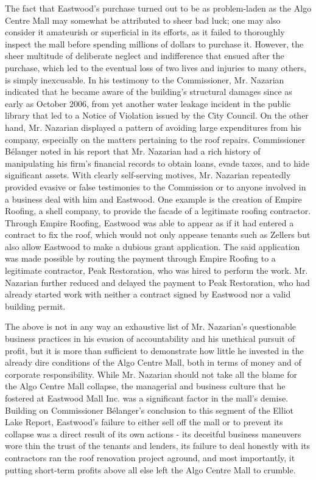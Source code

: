 \documentclass[12pt]{article}
\begin{document}
The fact that Eastwood's purchase turned out to be as problem-laden as the Algo Centre Mall may somewhat be attributed to sheer bad luck; one may also consider it amateurish or superficial in its efforts, as it failed to thoroughly inspect the mall before spending millions of dollars to purchase it. However, the sheer multitude of deliberate neglect and indifference that ensued after the purchase, which led to the eventual loss of two lives and injuries to many others, is simply inexcusable. In his testimony to the Commissioner, Mr. Nazarian indicated that he became aware of the building's structural damages since as early as October 2006, from yet another water leakage incident in the public library that led to a Notice of Violation issued by the City Council. On the other hand, Mr. Nazarian displayed a pattern of avoiding large expenditures from his company, especially on the matters pertaining to the roof repairs. Commissioner Bélanger noted in his report that Mr. Nazarian had a rich history of manipulating his firm's financial records to obtain loans, evade taxes, and to hide significant assets. With clearly self-serving motives, Mr. Nazarian repeatedly provided evasive or false testimonies to the Commission or to anyone involved in a business deal with him and Eastwood. One example is the creation of Empire Roofing, a shell company, to provide the facade of a legitimate roofing contractor. Through Empire Roofing, Eastwood was able to appear as if it had entered a contract to fix the roof, which would not only appease tenants such as Zellers but also allow Eastwood to make a dubious grant application. The said application was made possible by routing the payment through Empire Roofing to a legitimate contractor, Peak Restoration, who was hired to perform the work. Mr. Nazarian further reduced and delayed the payment to Peak Restoration, who had already started work with neither a contract signed by Eastwood nor a valid building permit. 

The above is not in any way an exhaustive list of Mr. Nazarian's questionable business practices in his evasion of accountability and his unethical pursuit of profit, but it is more than sufficient to demonstrate how little he invested in the already dire conditions of the Algo Centre Mall, both in terms of money and of corporate responsibility. While Mr. Nazarian should not take all the blame for the Algo Centre Mall collapse, the managerial and business culture that he fostered at Eastwood Mall Inc. was a significant factor in the mall's demise. Building on Commissioner Bélanger's conclusion to this segment of the Elliot Lake Report, Eastwood's failure to either sell off the mall or to prevent its collapse was a direct result of its own actions - its deceitful business maneuvers wore thin the trust of the tenants and lenders, its failure to deal honestly with its contractors ran the roof renovation project aground, and most importantly, it putting short-term profits above all else left the Algo Centre Mall to crumble.
\end{document}
